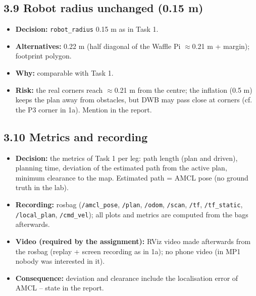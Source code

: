 \documentclass[10pt]{article}
\newcommand{\pkg}[1]{\texttt{#1}}
\begin{document}
\subsection*{3.9 Robot radius unchanged (0.15 m)}
\begin{itemize}
  \item \textbf{Decision:} \pkg{robot\_radius} 0.15 m as in Task 1.
  \item \textbf{Alternatives:} 0.22 m (half diagonal of the Waffle Pi $\approx$0.21 m + margin); footprint polygon.
  \item \textbf{Why:} comparable with Task 1.
  \item \textbf{Risk:} the real corners reach $\approx$0.21 m from the centre; the inflation (0.5 m) keeps the plan away from obstacles, but DWB may pass close at corners (cf. the P3 corner in 1a). Mention in the report.
\end{itemize}

\subsection*{3.10 Metrics and recording}
\begin{itemize}
  \item \textbf{Decision:} the metrics of Task 1 per leg: path length (plan and driven), planning time, deviation of the estimated path from the active plan, minimum clearance to the map. Estimated path = AMCL pose (no ground truth in the lab).
  \item \textbf{Recording:} rosbag (\pkg{/amcl\_pose}, \pkg{/plan}, \pkg{/odom}, \pkg{/scan}, \pkg{/tf}, \pkg{/tf\_static}, \pkg{/local\_plan}, \pkg{/cmd\_vel}); all plots and metrics are computed from the bags afterwards.
  \item \textbf{Video (required by the assignment):} RViz video made afterwards from the rosbag (replay + screen recording as in 1a); no phone video (in MP1 nobody was interested in it).
  \item \textbf{Consequence:} deviation and clearance include the localisation error of AMCL -- state in the report.
\end{itemize}
\end{document}
